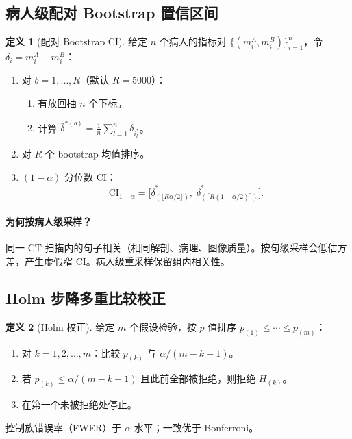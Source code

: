 \documentclass[11pt,a4paper]{article}
\theoremstyle{definition}
\newtheorem{definition}{定义}[section]
\begin{document}
\subsection{病人级配对 Bootstrap 置信区间}

\begin{definition}[配对 Bootstrap CI]
给定 $n$ 个病人的指标对 $\{(m_i^A, m_i^B)\}_{i=1}^{n}$，令 $\delta_i = m_i^A - m_i^B$：
\begin{enumerate}
    \item 对 $b = 1,\ldots,R$（默认 $R=5000$）：
    \begin{enumerate}[label=(\alph*)]
        \item 有放回抽 $n$ 个下标。
        \item 计算 $\bar{\delta}^{*(b)} = \frac{1}{n}\sum_{l=1}^n \delta_{i_l^*}$。
    \end{enumerate}
    \item 对 $R$ 个 bootstrap 均值排序。
    \item $(1-\alpha)$ 分位数 CI：
    \begin{equation}
    \mathrm{CI}_{1-\alpha} = \Big[\bar{\delta}^*_{(\lfloor R\alpha/2\rfloor)},\;\bar{\delta}^*_{(\lceil R(1-\alpha/2)\rceil)}\Big].
    \end{equation}
\end{enumerate}
\end{definition}

\paragraph{为何按病人级采样？}同一 CT 扫描内的句子相关（相同解剖、病理、图像质量）。按句级采样会低估方差，产生虚假窄 CI。病人级重采样保留组内相关性。


\subsection{Holm 步降多重比较校正}

\begin{definition}[Holm 校正]
给定 $m$ 个假设检验，按 $p$ 值排序 $p_{(1)} \leq \cdots \leq p_{(m)}$：
\begin{enumerate}
    \item 对 $k = 1,2,\ldots,m$：比较 $p_{(k)}$ 与 $\alpha/(m-k+1)$。
    \item 若 $p_{(k)} \leq \alpha/(m-k+1)$ 且此前全部被拒绝，则拒绝 $H_{(k)}$。
    \item 在第一个未被拒绝处停止。
\end{enumerate}
控制族错误率（FWER）于 $\alpha$ 水平；一致优于 Bonferroni。
\end{definition}
\end{document}
